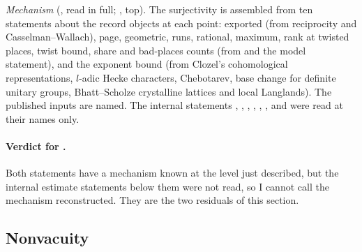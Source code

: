 \documentclass[11pt]{article}
\theoremstyle{remark}
\begin{document}
\noindent\emph{Mechanism} (, read in full; , top). The surjectivity is assembled from ten statements about the record objects at each point: exported (from reciprocity and Casselman--Wallach), page, geometric, runs, rational, maximum, rank at twisted places, twist bound, share and bad-places counts (from  and the model statement), and the exponent bound (from Clozel's cohomological representations, $l$-adic Hecke characters, Chebotarev, base change for definite unitary groups, Bhatt--Scholze crystalline lattices and local Langlands). The published inputs are named. The internal statements , , , , , ,  and  were read at their names only.

\paragraph{Verdict for .} Both statements have a mechanism known at the level just described, but the internal estimate statements below them were not read, so I cannot call the mechanism reconstructed. They are the two residuals of this section.

\subsection{Nonvacuity}\label{sec:fu3nonvac}
\end{document}
